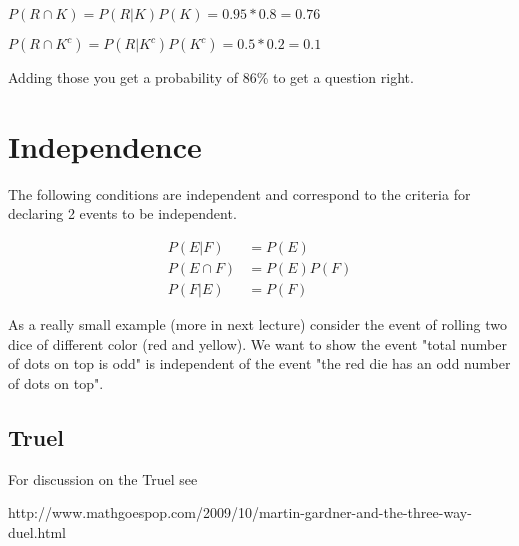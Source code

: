 \documentclass[12pt]{article}
\begin{document}
$P(R \cap K) = P(R|K)P(K) = 0.95 * 0.8 = 0.76$

$P(R \cap K^c) = P(R|K^c)P(K^c) = 0.5 * 0.2 = 0.1$

Adding those you get a probability of 86\% to get a question right.

\section*{Independence}

The following conditions are independent and correspond to the criteria for declaring 2 events to be independent.

\begin{align*}
P(E|F) &= P(E) \\
P(E \cap F) &= P(E)P(F) \\
P(F|E) &= P(F)
\end{align*}

\medskip

As a really small example (more in next lecture) consider the event of rolling two dice of different color (red and yellow). We want to show the event "total number of dots on top is odd" is independent of the event "the red die has an odd number of dots on top".


\subsection*{Truel}

For discussion on the Truel see 


http://www.mathgoespop.com/2009/10/martin-gardner-and-the-three-way-duel.html
\end{document}
